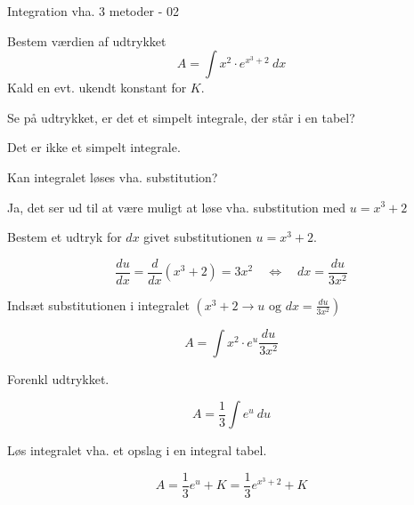 \documentclass{article}
\begin{document}
\begin{exercise}{Integration vha. 3 metoder - 02}

Bestem værdien af udtrykket
\[
A = \int x^2 \cdot e^{x^3 + 2} \ dx
\]
Kald en evt. ukendt konstant for $K$.


\hint
Se på udtrykket, er det et simpelt integrale, der står i en tabel?

\hint
Det er ikke et simpelt integrale.

\hint
Kan integralet løses vha. substitution?

\hint
Ja, det ser ud til at være muligt at løse vha. substitution med $u=x^3 + 2$

\hint
Bestem et udtryk for $dx$ givet substitutionen $u=x^3 + 2$.

\hint
\[
\frac{du}{dx} = \frac{d}{dx} \left(x^3 + 2 \right) = 3x^2 \quad \Leftrightarrow \quad dx = \frac{du}{3x^2}
\]

\hint
Indsæt substitutionen i integralet $\left(x^3 + 2 \rightarrow u \textrm{ og } dx = \frac{du}{3x^2} \right)$

\hint
\[
A = \int x^2 \cdot e^{u} \frac{du}{3x^2}
\]

\hint
Forenkl udtrykket.

\hint
\[
A = \frac{1}{3} \int e^{u} \ du
\]

\hint
Løs integralet vha. et opslag i en integral tabel.

\hint
\[
A = \frac{1}{3} e^{u} + K = \frac{1}{3} e^{x^3 + 2} + K
\]


\end{exercise}

\newpage
\end{document}
